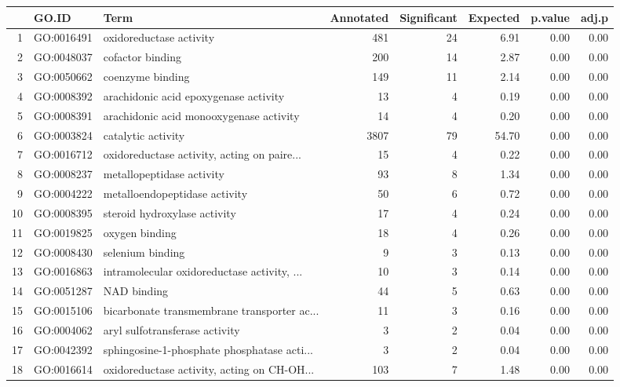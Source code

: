 \begin{table}[ht]
\centering
\begin{tabular}{rllrrrrr}
  \hline
 & GO.ID & Term & Annotated & Significant & Expected & p.value & adj.p \\ 
  \hline
1 & GO:0016491 & oxidoreductase activity & 481 &  24 & 6.91 & 0.00 & 0.00 \\ 
  2 & GO:0048037 & cofactor binding & 200 &  14 & 2.87 & 0.00 & 0.00 \\ 
  3 & GO:0050662 & coenzyme binding & 149 &  11 & 2.14 & 0.00 & 0.00 \\ 
  4 & GO:0008392 & arachidonic acid epoxygenase activity &  13 &   4 & 0.19 & 0.00 & 0.00 \\ 
  5 & GO:0008391 & arachidonic acid monooxygenase activity &  14 &   4 & 0.20 & 0.00 & 0.00 \\ 
  6 & GO:0003824 & catalytic activity & 3807 &  79 & 54.70 & 0.00 & 0.00 \\ 
  7 & GO:0016712 & oxidoreductase activity, acting on paire... &  15 &   4 & 0.22 & 0.00 & 0.00 \\ 
  8 & GO:0008237 & metallopeptidase activity &  93 &   8 & 1.34 & 0.00 & 0.00 \\ 
  9 & GO:0004222 & metalloendopeptidase activity &  50 &   6 & 0.72 & 0.00 & 0.00 \\ 
  10 & GO:0008395 & steroid hydroxylase activity &  17 &   4 & 0.24 & 0.00 & 0.00 \\ 
  11 & GO:0019825 & oxygen binding &  18 &   4 & 0.26 & 0.00 & 0.00 \\ 
  12 & GO:0008430 & selenium binding &   9 &   3 & 0.13 & 0.00 & 0.00 \\ 
  13 & GO:0016863 & intramolecular oxidoreductase activity, ... &  10 &   3 & 0.14 & 0.00 & 0.00 \\ 
  14 & GO:0051287 & NAD binding &  44 &   5 & 0.63 & 0.00 & 0.00 \\ 
  15 & GO:0015106 & bicarbonate transmembrane transporter ac... &  11 &   3 & 0.16 & 0.00 & 0.00 \\ 
  16 & GO:0004062 & aryl sulfotransferase activity &   3 &   2 & 0.04 & 0.00 & 0.00 \\ 
  17 & GO:0042392 & sphingosine-1-phosphate phosphatase acti... &   3 &   2 & 0.04 & 0.00 & 0.00 \\ 
  18 & GO:0016614 & oxidoreductase activity, acting on CH-OH... & 103 &   7 & 1.48 & 0.00 & 0.00 \\ 

\end{tabular}
\end{table}
